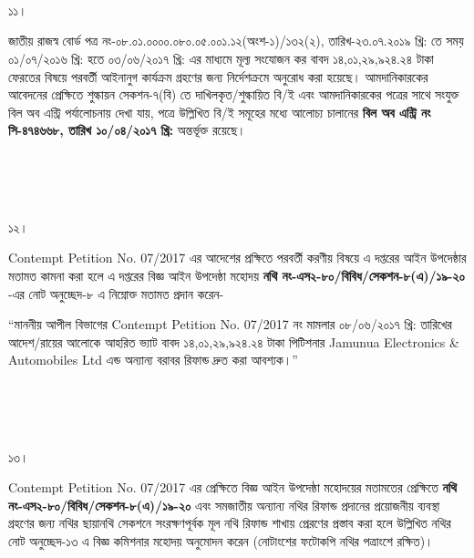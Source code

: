 \documentclass[12pt]{article}
\begin{document}
\\
\\
\\
\begin{minipage}[t]{0.05\linewidth}
১১।
\end{minipage}
\begin{minipage}[t]{1\linewidth}
জাতীয় রাজস্ব বোর্ড পত্র
নং-০৮.০১.০০০০.০৮০.০৫.০০১.১২(অংশ-১)/১৩২(২),
তারিখ-২৩.০৭.২০১৯ খ্রি:
তে সময়
০১/০৭/২০১৬ খ্রি: হতে ০৩/০৬/২০১৭ খ্রি:
এর মাধ্যমে মূল্য সংযোজন কর বাবদ
১৪,০১,২৯,৯২৪.২৪ টাকা
ফেরতের বিষয়ে পরবর্তী
আইনানুগ কার্যক্রম গ্রহণের জন্য
নির্দেশক্রমে অনুরোধ করা হয়েছে।
আমদানিকারকের আবেদনের প্রেক্ষিতে শুল্কায়ন
সেকশন-৭(বি) তে দাখিলকৃত/শুল্কায়িত
বি/ই এবং আমদানিকারকের
পত্রের সাথে সংযুক্ত বিল অব এন্ট্রি
পর্যালোচনায় দেখা যায়,
পত্রে উল্লিখিত বি/ই সমূহের
মধ্যে আলোচ্য চালানের
\textbf{বিল অব এন্ট্রি নং সি-৪৭৪৬৬৮, তারিখ ১০/০৪/২০১৭ খ্রি:}
অন্তর্ভূক্ত রয়েছে।
\end{minipage}
\\
\\
\\
\begin{minipage}[t]{0.05\linewidth}
১২।
\end{minipage}
\begin{minipage}[t]{1\linewidth}
Contempt Petition No. 07/2017
এর আদেশের প্রক্ষিতে পরবর্তী
করণীয় বিষয়ে এ দপ্তরের আইন
উপদেষ্ঠার মতামত কামনা করা হলে এ দপ্তরের
বিজ্ঞ আইন উপদেষ্ঠা মহোদয়
\textbf{নথি নং-এস২-৮০/বিবিধ/সেকশন-৮(এ)/১৯-২০}
-এর নোট অনুচ্ছেদ-৮ এ নিম্নোক্ত মতামত প্রদান করেন-


\hspace{1em}``মাননীয় আপীল বিভাগের
Contempt Petition No. 07/2017
নং মামলার ০৮/০৬/২০১৭ খ্রি: তারিখের
আদেশ/রায়ের আলোকে আহরিত ভ্যাট বাবদ
১৪,০১,২৯,৯২৪.২৪ টাকা
পিটিশনার
Jamunua Electronics \& Automobiles Ltd
এন্ড অন্যান্য বরাবর রিফান্ড
দ্রুত করা আবশ্যক।''
\end{minipage}
\\
\\
\\
\begin{minipage}[t]{0.05\linewidth}
১৩।
\end{minipage}
\begin{minipage}[t]{1\linewidth}
Contempt Petition No. 07/2017
এর প্রেক্ষিতে বিজ্ঞ আইন উপদেষ্ঠা মহোদয়ের
মতামতের প্রেক্ষিতে
\textbf{নথি নং-এস২-৮০/বিবিধ/সেকশন-৮(এ)/১৯-২০}
এবং সমজাতীয় অন্যান্য নথির
রিফান্ড প্রদানের প্রয়োজনীয় ব্যবস্থা গ্রহণের
জন্য নথির ছায়ানথি সেকশনে
সংরক্ষণপূর্বক মূল নথি রিফান্ড
শাখায় প্রেরণের প্রস্তাব করা হলে উল্লিখিত নথির
নোট অনুচ্ছেদ-১৩ এ বিজ্ঞ কমিশনার মহোদয় অনুমোদন
করেন (নোটাংশের ফটোকপি নথির পত্রাংশে রক্ষিত)।
\end{minipage}
\end{document}
